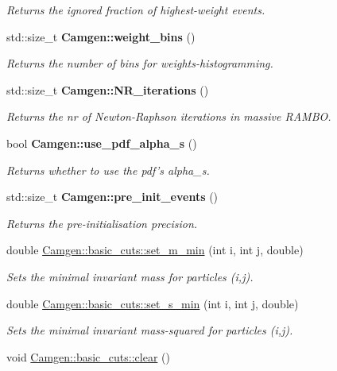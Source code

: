 \begin{DoxyCompactItemize}
\begin{DoxyCompactList}\small\item\em Returns the ignored fraction of highest-\/weight events. \end{DoxyCompactList}\item 
\hypertarget{a00849_a76102538735607adcb9e8d904203302d}{std\-::size\-\_\-t {\bfseries Camgen\-::weight\-\_\-bins} ()}\label{a00849_a76102538735607adcb9e8d904203302d}

\begin{DoxyCompactList}\small\item\em Returns the number of bins for weights-\/histogramming. \end{DoxyCompactList}\item 
\hypertarget{a00849_a97b1f4314d1b71089b429b36a56712a9}{std\-::size\-\_\-t {\bfseries Camgen\-::\-N\-R\-\_\-iterations} ()}\label{a00849_a97b1f4314d1b71089b429b36a56712a9}

\begin{DoxyCompactList}\small\item\em Returns the nr of Newton-\/\-Raphson iterations in massive R\-A\-M\-B\-O. \end{DoxyCompactList}\item 
\hypertarget{a00849_a22bfeba643397eecac7f5611cd031b3a}{bool {\bfseries Camgen\-::use\-\_\-pdf\-\_\-alpha\-\_\-s} ()}\label{a00849_a22bfeba643397eecac7f5611cd031b3a}

\begin{DoxyCompactList}\small\item\em Returns whether to use the pdf's alpha\-\_\-s. \end{DoxyCompactList}\item 
\hypertarget{a00849_a4bbfbf420fc1ca323a5c5696a1c356a0}{std\-::size\-\_\-t {\bfseries Camgen\-::pre\-\_\-init\-\_\-events} ()}\label{a00849_a4bbfbf420fc1ca323a5c5696a1c356a0}

\begin{DoxyCompactList}\small\item\em Returns the pre-\/initialisation precision. \end{DoxyCompactList}\item 
double \hyperlink{a00850_a2c6ac3377c1cfcca9c07fd789eb6d8a1}{Camgen\-::basic\-\_\-cuts\-::set\-\_\-m\-\_\-min} (int i, int j, double)
\begin{DoxyCompactList}\small\item\em Sets the minimal invariant mass for particles (i,j). \end{DoxyCompactList}\item 
double \hyperlink{a00850_a06768fc1ac5f34d8657a1b1dfd0a104d}{Camgen\-::basic\-\_\-cuts\-::set\-\_\-s\-\_\-min} (int i, int j, double)
\begin{DoxyCompactList}\small\item\em Sets the minimal invariant mass-\/squared for particles (i,j). \end{DoxyCompactList}\item 
\hypertarget{a00850_a7a908084900d0916765a80c48cbde675}{void \hyperlink{a00850_a7a908084900d0916765a80c48cbde675}{Camgen\-::basic\-\_\-cuts\-::clear} ()}\label{a00850_a7a908084900d0916765a80c48cbde675}


\end{DoxyCompactItemize}
